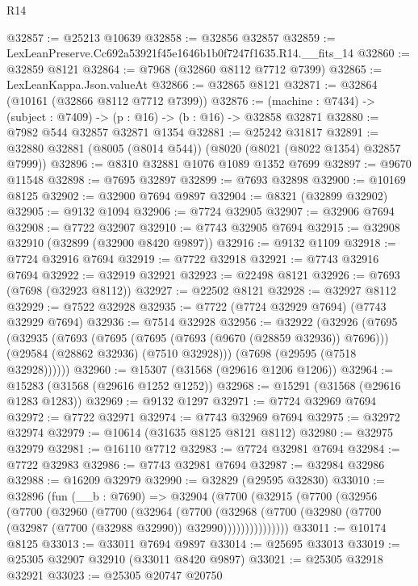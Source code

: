 \begin{lexlean}{R14}
\begin{coremodule}
@32857 := @25213 @10639
@32858 := @32856 @32857
@32859 := LexLeanPreserve.Cc692a53921f45e1646b1b0f7247f1635.R14.__fits_14
@32860 := @32859 @8121
@32864 := @7968 (@32860 @8112 @7712 @7399)
@32865 := LexLeanKappa.Json.valueAt
@32866 := @32865 @8121
@32871 := @32864 (@10161 (@32866 @8112 @7712 @7399))
@32876 := (machine : @7434) -> (subject : @7409) -> (p : @16) -> (b : @16) -> @32858 @32871
@32880 := @7982 @544 @32857 @32871 @1354
@32881 := @25242 @31817
@32891 := @32880 @32881 (@8005 (@8014 @544)) (@8020 (@8021 (@8022 @1354) @32857 @7999))
@32896 := @8310 @32881 @1076 @1089 @1352 @7699
@32897 := @9670 @11548
@32898 := @7695 @32897
@32899 := @7693 @32898
@32900 := @10169 @8125
@32902 := @32900 @7694 @9897
@32904 := @8321 (@32899 @32902)
@32905 := @9132 @1094
@32906 := @7724 @32905
@32907 := @32906 @7694
@32908 := @7722 @32907
@32910 := @7743 @32905 @7694
@32915 := @32908 @32910 (@32899 (@32900 @8420 @9897))
@32916 := @9132 @1109
@32918 := @7724 @32916 @7694
@32919 := @7722 @32918
@32921 := @7743 @32916 @7694
@32922 := @32919 @32921
@32923 := @22498 @8121
@32926 := @7693 (@7698 (@32923 @8112))
@32927 := @22502 @8121
@32928 := @32927 @8112
@32929 := @7522 @32928
@32935 := @7722 (@7724 @32929 @7694) (@7743 @32929 @7694)
@32936 := @7514 @32928
@32956 := @32922
    (@32926
      (@7695
        (@32935
          (@7693
            (@7695 (@7695 (@7693 (@9670 (@28859 @32936)) @7696)))
            (@29584 (@28862 @32936) (@7510 @32928)))
          (@7698 (@29595 (@7518 @32928))))))
@32960 := @15307 (@31568 (@29616 @1206 @1206))
@32964 := @15283 (@31568 (@29616 @1252 @1252))
@32968 := @15291 (@31568 (@29616 @1283 @1283))
@32969 := @9132 @1297
@32971 := @7724 @32969 @7694
@32972 := @7722 @32971
@32974 := @7743 @32969 @7694
@32975 := @32972 @32974
@32979 := @10614 (@31635 @8125 @8121 @8112)
@32980 := @32975 @32979
@32981 := @16110 @7712
@32983 := @7724 @32981 @7694
@32984 := @7722 @32983
@32986 := @7743 @32981 @7694
@32987 := @32984 @32986
@32988 := @16209 @32979
@32990 := @32829 (@29595 @32830)
@33010 := @32896
    (fun (__b : @7690) =>
    @32904
      (@7700
        (@32915
          (@7700
            (@32956
              (@7700
                (@32960
                  (@7700
                    (@32964
                      (@7700
                        (@32968
                          (@7700
                            (@32980 (@7700 (@32987 (@7700 (@32988 @32990)) @32990)))))))))))))))
@33011 := @10174 @8125
@33013 := @33011 @7694 @9897
@33014 := @25695 @33013
@33019 := @25305 @32907 @32910 (@33011 @8420 @9897)
@33021 := @25305 @32918 @32921
@33023 := @25305 @20747 @20750

\end{coremodule}
\end{lexlean}
